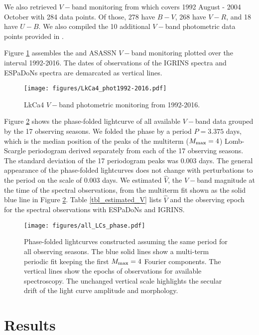 \documentclass[onecolumn]{emulateapj}%
\newcommand{\name}{LkCa4 }
\begin{document}
We also retrieved $V-$band monitoring from \citet{grankin08} which covers 1992 August - 2004 October with 284 data points.  Of those, 278 have $B-V$, 268 have $V-R$, and 18 have $U-B$.  We also compiled the 10 additional $V-$band photometric data points provided in \citet{2014MNRAS.444.3220D}.

Figure \ref{fig:PhotTime} assembles the \citet{grankin08} and ASASSN $V-$band monitoring plotted over the interval 1992-2016.  The dates of observations of the IGRINS spectra and ESPaDoNs spectra are demarcated as vertical lines.

\begin{figure*}
	\centering
	\texttt{[image: figures/LkCa4\_phot1992-2016.pdf]}
	\caption{\name $V-$band photometric monitoring from 1992-2016.}
	\label{fig:PhotTime}
\end{figure*}

Figure \ref{fig:PhotPhase} shows the phase-folded lightcurve of all available $V-$band data grouped by the 17 observing seasons.  We folded the phase by a period $P=3.375$ days, which is the median position of the peaks of the multiterm ($M_{\rm max} = 4$) Lomb-Scargle periodogram derived separately from each of the 17 observing seasons.  The standard deviation of the 17 periodogram peaks was 0.003 days.  The general appearance of the phase-folded lightcurves does not change with perturbations to the period on the scale of 0.003 days.  We estimated $\hat V$, the $V-$band magnitude at the time of the spectral observations, from the multiterm fit shown as the solid blue line in Figure \ref{fig:PhotPhase}.  Table \ref{tbl_estimated_V} lists $\hat V$ and the observing epoch for the spectral observations with ESPaDoNs and IGRINS.

\begin{figure*}
	\centering
	\texttt{[image: figures/all\_LCs\_phase.pdf]}
	\caption{Phase-folded lightcurves constructed assuming the same period for all observing seasons.  The blue solid lines show a multi-term periodic fit keeping the first $M_{\rm max}=4$ Fourier components.  The vertical lines show the epochs of observations for available spectroscopy.  The unchanged vertical scale highlights the secular drift of the light curve amplitude and morphology.}
	\label{fig:PhotPhase}
\end{figure*}






\section{Results}
\end{document}
